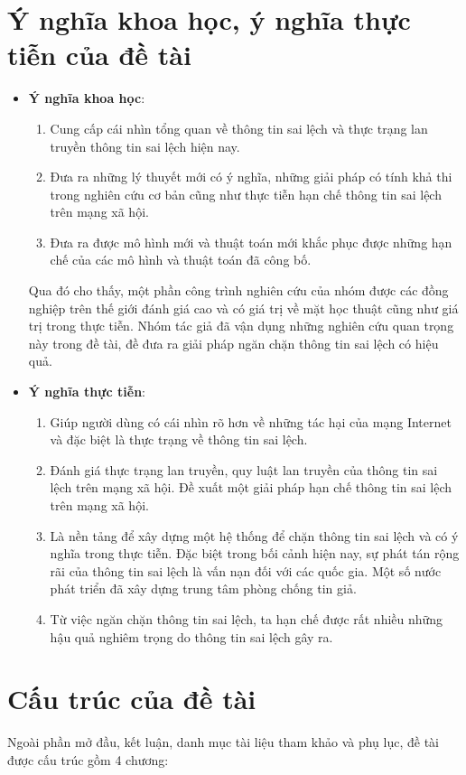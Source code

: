 \tocless\section {Ý nghĩa khoa học, ý nghĩa thực tiễn của đề tài}
\begin {itemize}
	\item {\bfseries Ý nghĩa khoa học}: 
		\begin {enumerate} [+]
			\item Cung cấp cái nhìn tổng quan về thông tin sai lệch và thực trạng lan truyền thông tin sai lệch hiện nay.
			\item Đưa ra những lý thuyết mới có ý nghĩa, những giải pháp có tính khả thi trong nghiên cứu cơ bản cũng như thực tiễn hạn chế thông tin sai lệch trên mạng xã hội.
			\item Đưa ra được mô hình mới và thuật toán mới khắc phục được những hạn chế của các mô hình và thuật toán đã công bố.
		\end {enumerate}
		Qua đó cho thấy, một phần công trình nghiên cứu của nhóm được các đồng nghiệp trên thế giới đánh giá cao và có giá trị về mặt học thuật cũng như giá trị trong thực tiễn. Nhóm tác giả đã vận dụng những nghiên cứu quan trọng này trong đề tài, đề đưa ra giải pháp ngăn chặn thông tin sai lệch có hiệu quả.
	\item {\bfseries Ý nghĩa thực tiễn}:
		\begin {enumerate} [+]
			\item Giúp người dùng có cái nhìn rõ hơn về những tác hại của mạng Internet và đặc biệt là thực trạng về thông tin sai lệch.
			\item Đánh giá thực trạng lan truyền, quy luật lan truyền của thông tin sai lệch trên mạng xã hội. Đề xuất một giải pháp hạn chế thông tin sai lệch trên mạng xã hội.
			\item Là nền tảng để xây dựng một hệ thống để chặn thông tin sai lệch và có ý nghĩa trong thực tiễn. Đặc biệt trong bối cảnh hiện nay, sự phát tán rộng rãi của thông tin sai lệch là vấn nạn đối với các quốc gia. Một số nước phát triển đã xây dựng trung tâm phòng chống tin giả.
			\item Từ việc ngăn chặn thông tin sai lệch, ta hạn chế được rất nhiều những hậu quả nghiêm trọng do thông tin sai lệch gây ra.
		\end {enumerate}
\end {itemize}

\tocless\section {Cấu trúc của đề tài}
Ngoài phần mở đầu, kết luận, danh mục tài liệu tham khảo và phụ lục, đề tài được cấu trúc gồm 4 chương:

